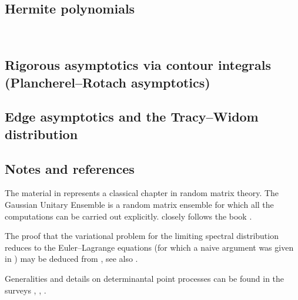 \documentclass[letterpaper,11pt,oneside,reqno]{amsart}
\numberwithin{equation}{section}
\newcounter{lecture}
\newcommand{\lect}[1]{\bigskip\addtocounter{lecture}{1}\noindent{\Large{\color{red}\bf{}Lecture \#\arabic{lecture} on #1 \hrulefill}}}
\theoremstyle{definition}
\begin{document}
\subsection{Hermite polynomials} %
\label{sub:hermite_polynomials}


{\ }\\\lect{3/16/2016}

\subsection{Rigorous asymptotics via contour integrals (Plancherel--Rotach asymptotics)} %
\label{sub:rigorous_asymptotics_via_contour_integrals}

\cite{Plancherel_Rotach_original}


\subsection{Edge asymptotics and the Tracy--Widom distribution} %
\label{sub:edge_asymptotics_and_the_tracy_widom_distribution}

\cite{TW_Airy_Painleve_2002}


\subsection{Notes and references} %
\label{sub:notes_GUE}

The material in  represents a classical 
chapter in random matrix theory. 
The Gaussian Unitary Ensemble is a random matrix ensemble for which all the computations
can be carried out explicitly. 
closely follows the book \cite{TaoRMbook}.

The proof that the variational problem for the limiting spectral distribution
reduces to the Euler--Lagrange equations
(for which a naive argument was given in )
may be deduced from \cite{saff2013logarithmic}, see also \cite{Forrester-LogGas}.

Generalities and details on determinantal point processes can be found in the 
surveys \cite{Soshnikov2000}, 
\cite{peres2006determinantal},
\cite{Borodin2009}.
\end{document}
